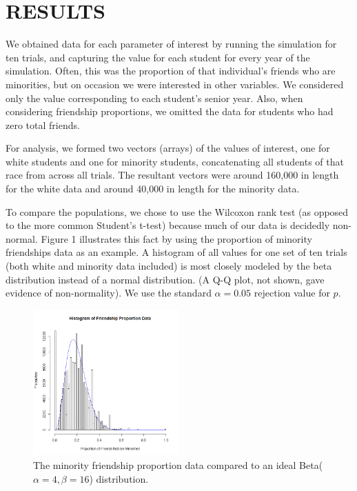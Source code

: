 
\section{RESULTS}
\label{sec:results}

We obtained data for each parameter of interest by running the simulation for
ten trials, and capturing the value for each student for every year of the
simulation. Often, this was the proportion of that individual's friends who
are minorities, but on occasion we were interested in other variables. We
considered only the value corresponding to each student's senior year. Also,
when considering friendship proportions, we omitted the data for students who
had zero total friends. 

For analysis, we formed two vectors (arrays) of the values of interest, one
for white students and one for minority students, concatenating all students
of that race from across all trials. The resultant vectors were around 160,000
in length for the white data and around 40,000 in length for the minority
data.

To compare the populations, we chose to use the Wilcoxon rank test (as opposed
to the more common Student's t-test) because much of our data is decidedly
non-normal. Figure 1 illustrates this fact by using the proportion of minority
friendships data as an example. A histogram of all values for one set of ten
trials (both white and minority data included) is most closely modeled by the
beta distribution instead of a normal distribution. (A Q-Q plot, not shown,
gave evidence of non-normality). We use the standard $\alpha=0.05$ rejection
value for $p$.

\begin{figure}[ht]
  \centering
    \includegraphics[width=0.5\textwidth]{histogramProportionData.png}
      \caption{The minority friendship proportion data compared to an ideal 
Beta($\alpha=4,\beta=16$) distribution.}
\end{figure}

